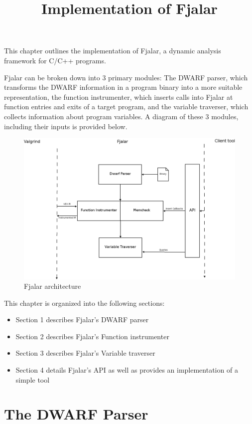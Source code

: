 \documentclass[11pt]{article}
\title{Implementation of Fjalar}
\date{}
\author{}
\begin{document}
 \maketitle
This chapter outlines the implementation of Fjalar, a dynamic analysis
framework for C/C++ programs. 

Fjalar can be broken down into 3 primary modules: The DWARF parser,
which transforms the DWARF information in a program
binary into a more suitable representation, the function
instrumenter, which inserts calls into Fjalar at function entries and
exits of a target program, and the variable traverser, which
collects information about program variables. A diagram of these 3
modules, including their inputs is provided below.

\begin{figure}
\noindent
\centering
\includegraphics[width=150mm]{fjalar-arch-initial.png}
\caption{Fjalar architecture}
\end{figure}

This chapter is organized into the following sections: 

\begin{itemize}
\item Section 1 describes Fjalar's DWARF parser
\item Section 2 describes Fjalar's Function instrumenter
\item Section 3 describes Fjalar's Variable traverser
\item Section 4 details Fjalar's API as well as provides an
  implementation of a simple tool
\end{itemize}

\section{The DWARF Parser}
\end{document}
